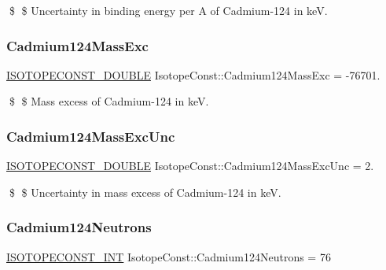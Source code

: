 \$ \$ Uncertainty in binding energy per A of Cadmium-\/124 in keV. \mbox{\label{group___isotope_const-_cadmium-_cd124_gaf07f33c21c5c9a097e0949e7863e9a22}} 
\subsubsection{\texorpdfstring{Cadmium124\+Mass\+Exc}{Cadmium124MassExc}}
{\footnotesize\ttfamily \mbox{\hyperlink{group___isotope_const-_macros_ga8f45a7272ce02c0b4c65c44636ed719a}{I\+S\+O\+T\+O\+P\+E\+C\+O\+N\+S\+T\+\_\+\+D\+O\+U\+B\+LE}} Isotope\+Const\+::\+Cadmium124\+Mass\+Exc = -\/76701.}

\$ \$ Mass excess of Cadmium-\/124 in keV. \mbox{\label{group___isotope_const-_cadmium-_cd124_ga21e3c43783edb40cb96c1ed8819c8c6f}} 
\subsubsection{\texorpdfstring{Cadmium124\+Mass\+Exc\+Unc}{Cadmium124MassExcUnc}}
{\footnotesize\ttfamily \mbox{\hyperlink{group___isotope_const-_macros_ga8f45a7272ce02c0b4c65c44636ed719a}{I\+S\+O\+T\+O\+P\+E\+C\+O\+N\+S\+T\+\_\+\+D\+O\+U\+B\+LE}} Isotope\+Const\+::\+Cadmium124\+Mass\+Exc\+Unc = 2.}

\$ \$ Uncertainty in mass excess of Cadmium-\/124 in keV. \mbox{\label{group___isotope_const-_cadmium-_cd124_ga2d99835ad48c69fb861beeffafe6a40e}} 
\subsubsection{\texorpdfstring{Cadmium124\+Neutrons}{Cadmium124Neutrons}}
{\footnotesize\ttfamily \mbox{\hyperlink{group___isotope_const-_macros_ga5f18360b3e99483a35c32d789e62621c}{I\+S\+O\+T\+O\+P\+E\+C\+O\+N\+S\+T\+\_\+\+I\+NT}} Isotope\+Const\+::\+Cadmium124\+Neutrons = 76}

